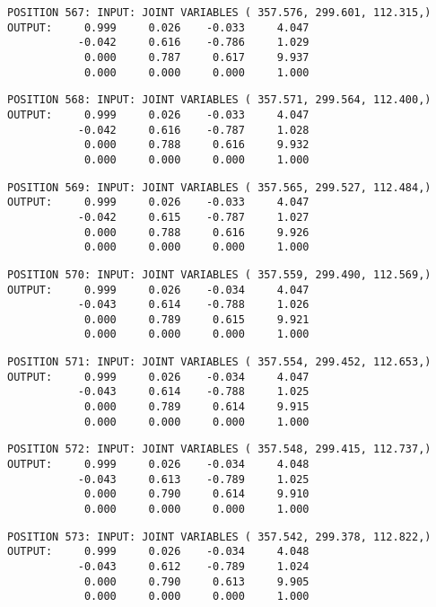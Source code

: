 \begin{verbatim}
POSITION 567: INPUT: JOINT VARIABLES ( 357.576, 299.601, 112.315,)
OUTPUT:     0.999     0.026    -0.033     4.047
           -0.042     0.616    -0.786     1.029
            0.000     0.787     0.617     9.937
            0.000     0.000     0.000     1.000
\end{verbatim} \pagebreak[1]\begin{verbatim}
POSITION 568: INPUT: JOINT VARIABLES ( 357.571, 299.564, 112.400,)
OUTPUT:     0.999     0.026    -0.033     4.047
           -0.042     0.616    -0.787     1.028
            0.000     0.788     0.616     9.932
            0.000     0.000     0.000     1.000
\end{verbatim} \pagebreak[1]\begin{verbatim}
POSITION 569: INPUT: JOINT VARIABLES ( 357.565, 299.527, 112.484,)
OUTPUT:     0.999     0.026    -0.033     4.047
           -0.042     0.615    -0.787     1.027
            0.000     0.788     0.616     9.926
            0.000     0.000     0.000     1.000
\end{verbatim} \pagebreak[1]\begin{verbatim}
POSITION 570: INPUT: JOINT VARIABLES ( 357.559, 299.490, 112.569,)
OUTPUT:     0.999     0.026    -0.034     4.047
           -0.043     0.614    -0.788     1.026
            0.000     0.789     0.615     9.921
            0.000     0.000     0.000     1.000
\end{verbatim} \pagebreak[1]\begin{verbatim}
POSITION 571: INPUT: JOINT VARIABLES ( 357.554, 299.452, 112.653,)
OUTPUT:     0.999     0.026    -0.034     4.047
           -0.043     0.614    -0.788     1.025
            0.000     0.789     0.614     9.915
            0.000     0.000     0.000     1.000
\end{verbatim} \pagebreak[1]\begin{verbatim}
POSITION 572: INPUT: JOINT VARIABLES ( 357.548, 299.415, 112.737,)
OUTPUT:     0.999     0.026    -0.034     4.048
           -0.043     0.613    -0.789     1.025
            0.000     0.790     0.614     9.910
            0.000     0.000     0.000     1.000
\end{verbatim} \pagebreak[1]\begin{verbatim}
POSITION 573: INPUT: JOINT VARIABLES ( 357.542, 299.378, 112.822,)
OUTPUT:     0.999     0.026    -0.034     4.048
           -0.043     0.612    -0.789     1.024
            0.000     0.790     0.613     9.905
            0.000     0.000     0.000     1.000
\end{verbatim} \pagebreak[1]\begin{verbatim}

\end{verbatim}
